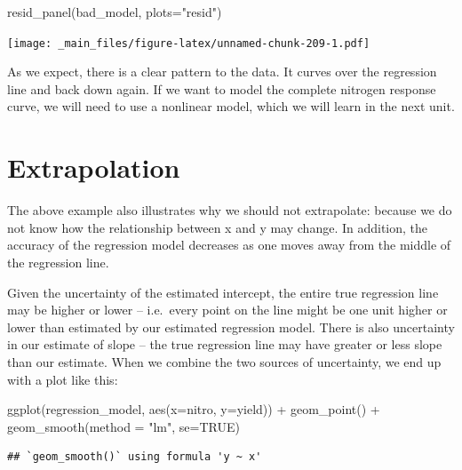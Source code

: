 \documentclass[
]{book}
\newenvironment{Shaded}{\begin{snugshade}}{\end{snugshade}}
\newcommand{\AttributeTok}[1]{\textcolor[rgb]{0.77,0.63,0.00}{#1}}
\newcommand{\ConstantTok}[1]{\textcolor[rgb]{0.00,0.00,0.00}{#1}}
\newcommand{\FunctionTok}[1]{\textcolor[rgb]{0.00,0.00,0.00}{#1}}
\newcommand{\NormalTok}[1]{#1}
\newcommand{\SpecialCharTok}[1]{\textcolor[rgb]{0.00,0.00,0.00}{#1}}
\newcommand{\StringTok}[1]{\textcolor[rgb]{0.31,0.60,0.02}{#1}}
\begin{document}
\begin{Shaded}
\begin{Highlighting}[]
\FunctionTok{resid\_panel}\NormalTok{(bad\_model, }\AttributeTok{plots=}\StringTok{"resid"}\NormalTok{)}
\end{Highlighting}
\end{Shaded}

\texttt{[image: \_main\_files/figure-latex/unnamed-chunk-209-1.pdf]}

As we expect, there is a clear pattern to the data. It curves over the regression line and back down again. If we want to model the complete nitrogen response curve, we will need to use a nonlinear model, which we will learn in the next unit.

\hypertarget{extrapolation}{%
\section{Extrapolation}\label{extrapolation}}

The above example also illustrates why we should not extrapolate: because we do not know how the relationship between x and y may change. In addition, the accuracy of the regression model decreases as one moves away from the middle of the regression line.

Given the uncertainty of the estimated intercept, the entire true regression line may be higher or lower -- i.e.~every point on the line might be one unit higher or lower than estimated by our estimated regression model. There is also uncertainty in our estimate of slope -- the true regression line may have greater or less slope than our estimate. When we combine the two sources of uncertainty, we end up with a plot like this:

\begin{Shaded}
\begin{Highlighting}[]
\FunctionTok{ggplot}\NormalTok{(regression\_model, }\FunctionTok{aes}\NormalTok{(}\AttributeTok{x=}\NormalTok{nitro, }\AttributeTok{y=}\NormalTok{yield)) }\SpecialCharTok{+}
  \FunctionTok{geom\_point}\NormalTok{() }\SpecialCharTok{+}
  \FunctionTok{geom\_smooth}\NormalTok{(}\AttributeTok{method =} \StringTok{"lm"}\NormalTok{, }\AttributeTok{se=}\ConstantTok{TRUE}\NormalTok{)}
\end{Highlighting}
\end{Shaded}

\begin{verbatim}
## `geom_smooth()` using formula 'y ~ x'
\end{verbatim}
\end{document}
